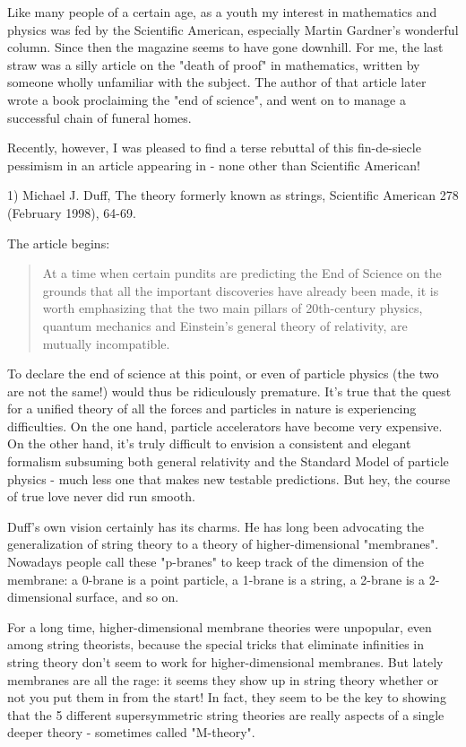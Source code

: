 

Like many people of a certain age, as a youth my interest in mathematics
and physics was fed by the Scientific American, especially Martin
Gardner's wonderful column.  Since then the magazine seems to have gone
downhill.  For me, the last straw was a silly article on the "death of
proof" in mathematics, written by someone wholly unfamiliar with the
subject.  The author of that article later wrote a book proclaiming the
"end of science", and went on to manage a successful chain of funeral
homes.

Recently, however, I was pleased to find a terse rebuttal of this
fin-de-siecle pessimism in an article appearing in - none other than
Scientific American!

1) Michael J. Duff, The theory formerly known as strings, Scientific
American 278 (February 1998), 64-69.  

The article begins:

\begin{quote}
    At a time when certain pundits are predicting the End of Science
    on the grounds that all the important discoveries have already
    been made, it is worth emphasizing that the two main pillars of
    20th-century physics, quantum mechanics and Einstein's general 
    theory of relativity, are mutually incompatible.  
\end{quote}
    
To declare the end of science at this point, or even of particle physics
(the two are not the same!) would thus be ridiculously
premature.  It's true that the quest for a unified theory of all the
forces and particles in nature is experiencing difficulties.  On the one
hand, particle accelerators have become very expensive.  On the other
hand, it's truly difficult to envision a consistent and elegant
formalism subsuming both general relativity and the Standard Model
of particle physics - much less one that makes new testable predictions.
But hey, the course of true love never did run smooth.

Duff's own vision certainly has its charms.  He has long been advocating
the generalization of string theory to a theory of higher-dimensional
"membranes".  Nowadays people call these "p-branes" to keep track of the
dimension of the membrane: a 0-brane is a point particle, a 1-brane is a
string, a 2-brane is a 2-dimensional surface, and so on.

For a long time, higher-dimensional membrane theories were unpopular,
even among string theorists, because the special tricks that eliminate
infinities in string theory don't seem to work for higher-dimensional
membranes.  But lately membranes are all the rage: it seems they show up
in string theory whether or not you put them in from the start!  In
fact, they seem to be the key to showing that the 5 different
supersymmetric string theories are really aspects of a single deeper
theory - sometimes called "M-theory".

